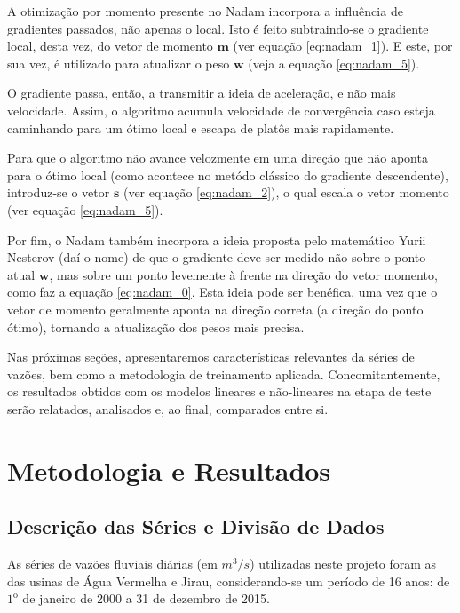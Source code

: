 \documentclass[a4paper]{article}
\begin{document}
\begin{multicols}{2}
A otimização por momento presente no Nadam incorpora a influência de gradientes passados, não apenas o local. Isto é feito subtraindo-se o gradiente local, desta vez, do vetor de momento $\mathbf{m}$ (ver equação \eqref{eq:nadam_1}). E este, por sua vez, é utilizado para atualizar o peso $\mathbf{w}$ (veja a equação \eqref{eq:nadam_5}). 

O gradiente passa, então, a transmitir a ideia de aceleração, e não mais velocidade. Assim, o algoritmo acumula velocidade de convergência caso esteja caminhando para um ótimo local e escapa de platôs mais rapidamente.

Para que o algoritmo não avance velozmente em uma direção que não aponta para o ótimo local (como acontece no metódo clássico do gradiente descendente), introduz-se o vetor $\mathbf{s}$ (ver equação \eqref{eq:nadam_2}), o qual escala o vetor momento (ver equação \eqref{eq:nadam_5}). 

Por fim, o Nadam também incorpora a ideia proposta pelo matemático Yurii Nesterov (daí o nome) de que o gradiente deve ser medido não sobre o ponto atual $\mathbf{w}$, mas sobre um ponto levemente à frente na direção do vetor momento, como faz a equação \eqref{eq:nadam_0}. Esta ideia pode ser benéfica, uma vez que o vetor de momento geralmente aponta na direção correta (a direção do ponto ótimo), tornando a atualização dos pesos mais precisa.

Nas próximas seções, apresentaremos características relevantes da séries de vazões, bem como a metodologia de treinamento aplicada. Concomitantemente, os resultados obtidos com os modelos lineares e não-lineares na etapa de teste serão relatados, analisados e, ao final, comparados entre si.

\section{Metodologia e Resultados}
\label{sec:metodologia}
    
\subsection{Descrição das Séries e Divisão de Dados}
\label{subsec:serie}
    
    As séries de vazões fluviais diárias (em $m^3/s$) utilizadas neste projeto foram as das usinas de Água Vermelha e Jirau, considerando-se um período de 16 anos: de $1^\text{o}$ de janeiro de 2000 a 31 de dezembro de 2015.
    

\end{multicols}
\end{document}
